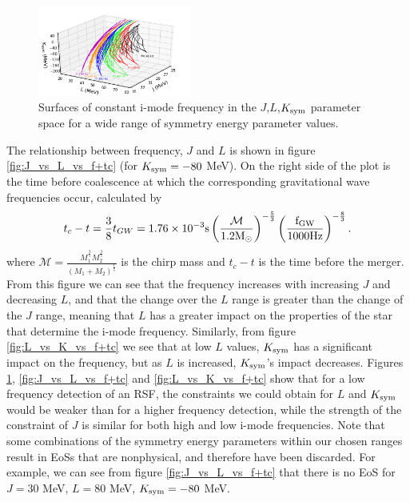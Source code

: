 \documentclass[fleqn,usenatbib]{mnras}
\begin{document}
\begin{figure}
\centering
\includegraphics[width=0.45\textwidth,angle=0]{grid_J_L_K.png}
\caption{Surfaces of constant i-mode frequency in the $J$,$L$,$K_{\rm sym}$ parameter space for a wide range of symmetry energy parameter values.}
\label{fig:grid_J_L_K}
\end{figure}





The relationship between frequency, $J$ and $L$ is shown in figure \ref{fig:J_vs_L_vs_f+tc} (for $K_{\rm sym}=-80$ MeV). On the right side of the plot is the time before coalescence at which the corresponding gravitational wave frequencies occur, calculated by \citep{blanchet2006gravitational} %
\begin{align}
t_c-t=\frac{3}{8}t_{GW}=1.76\times 10^{-3}\rm{s}\left(\frac{\mathcal{M}}{1.2M_{\odot}}\right)^{-\frac{5}{3}}\left(\frac{f_{GW}}{1000 \rm{Hz}}\right)^{-\frac{8}{3}}.
\label{eq:t_before_merger}
\end{align}
\noindent where $\mathcal{M}=\frac{M_1^{\frac{3}{5}}M_2^{\frac{3}{5}}}{(M_1+M_2)^{\frac{1}{5}}}$ is the chirp mass and $t_c-t$ is the time before the merger. From this figure we can see that the frequency increases with increasing $J$ and decreasing $L$, and that the change over the $L$ range is greater than the change of the $J$ range, meaning that $L$ has a greater impact on the properties of the star that determine the i-mode frequency. Similarly, from figure \ref{fig:L_vs_K_vs_f+tc} we see that at low $L$ values, $K_{\rm sym}$ has a significant impact on the frequency, but as $L$ is increased, $K_{\rm sym}$'s impact decreases. Figures \ref{fig:grid_J_L_K}, \ref{fig:J_vs_L_vs_f+tc} and \ref{fig:L_vs_K_vs_f+tc} show that for a low frequency detection of an RSF, the constraints we could obtain for $L$ and $K_{\rm sym}$ would be weaker than for a higher frequency detection, while the strength of the constraint of $J$ is similar for both high and low i-mode frequencies. Note that some combinations of the symmetry energy parameters within our chosen ranges result in EoSs that are nonphysical, and therefore have been discarded. For example, we can see from figure \ref{fig:J_vs_L_vs_f+tc} that there is no EoS for $J=30$ MeV, $L=80$ MeV, $K_{\rm sym}=-80$ MeV.
\end{document}
